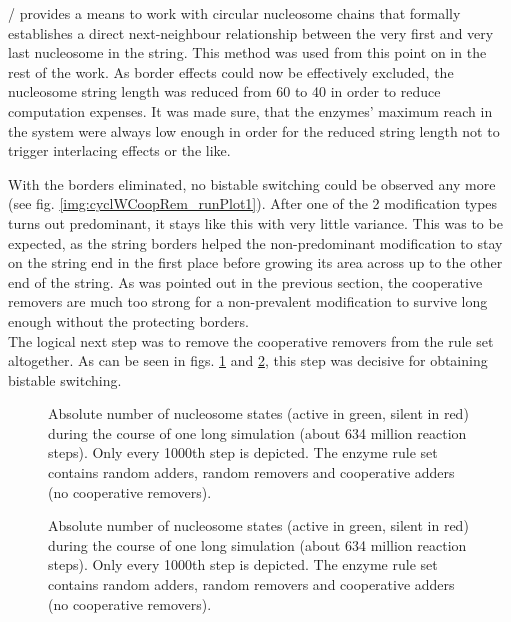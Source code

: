         \ed/ provides a means to work with circular nucleosome chains that formally establishes a direct next-neighbour relationship between the very first and very last nucleosome in the string. This method was used from this point on in the rest of the work. As border effects could now be effectively excluded, the nucleosome string length was reduced from 60 to 40 in order to reduce computation expenses. It was made sure, that the enzymes' maximum reach in the system were always low enough in order for the reduced string length not to trigger interlacing effects or the like.

        With the borders eliminated, no bistable switching could be observed any more (see fig. \ref{img:cyclWCoopRem_runPlot1}). After one of the 2 modification types turns out predominant, it stays like this with very little variance. This was to be expected, as the string borders helped the non-predominant modification to stay on the string end in the first place before growing its area across up to the other end of the string. As was pointed out in the previous section, the cooperative removers are much too strong for a non-prevalent modification to survive long enough without the protecting borders.\\

        The logical next step was to remove the cooperative removers from the rule set altogether. As can be seen in figs. \ref{img:cyclBistability_runPlot1} and \ref{img:cyclBistability_runPlot2}, this step was decisive for obtaining bistable switching.

        \begin{figure}[htpb!]
            \centering
            \caption{Absolute number of nucleosome states (active in green, silent in red) during the course of one long simulation (about 634 million reaction steps). Only every 1000th step is depicted. The enzyme rule set contains random adders, random removers and cooperative adders (no cooperative removers).}
            \label{img:cyclBistability_runPlot1}
        \end{figure}

        \begin{figure}[htpb!]
            \centering
            \caption{Absolute number of nucleosome states (active in green, silent in red) during the course of one long simulation (about 634 million reaction steps). Only every 1000th step is depicted. The enzyme rule set contains random adders, random removers and cooperative adders (no cooperative removers).}
            \label{img:cyclBistability_runPlot2}
        \end{figure}

